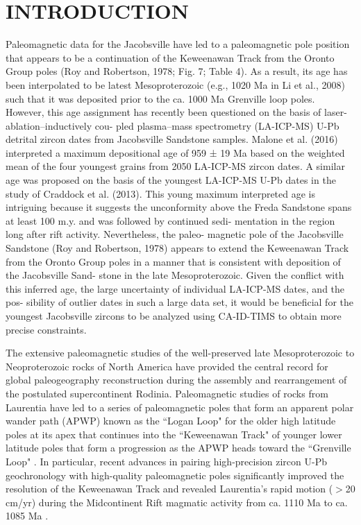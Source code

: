 \documentclass[11pt,letterpaper]{article}
\begin{document}
\section*{INTRODUCTION}

Paleomagnetic data for the Jacobsville have led to a paleomagnetic pole position that appears to be a continuation of the Keweenawan Track from the Oronto Group poles (Roy and Robertson, 1978; Fig. 7; Table 4). As a result, its age has been interpolated to be latest Mesoproterozoic (e.g., 1020 Ma in Li et al., 2008) such that it was deposited prior to the ca. 1000 Ma Grenville loop poles. However, this age assignment has recently been questioned on the basis of laser-ablation–inductively cou- pled plasma–mass spectrometry (LA-ICP-MS) U-Pb detrital zircon dates from Jacobsville Sandstone samples. Malone et al. (2016) interpreted a maximum depositional age of 959 ± 19 Ma based on the weighted mean of the four youngest grains from 2050 LA-ICP-MS zircon dates. A similar age was proposed on the basis of the youngest LA-ICP-MS U-Pb dates in the study of Craddock et al. (2013). This young maximum interpreted age is intriguing because it suggests the unconformity above the Freda Sandstone spans at least 100 m.y. and was followed by continued sedi- mentation in the region long after rift activity. Nevertheless, the paleo- magnetic pole of the Jacobsville Sandstone (Roy and Robertson, 1978) appears to extend the Keweenawan Track from the Oronto Group poles in a manner that is consistent with deposition of the Jacobsville Sand- stone in the late Mesoproterozoic. Given the conflict with this inferred age, the large uncertainty of individual LA-ICP-MS dates, and the pos- sibility of outlier dates in such a large data set, it would be beneficial for the youngest Jacobsville zircons to be analyzed using CA-ID-TIMS to obtain more precise constraints.


The extensive paleomagnetic studies of the well-preserved late Mesoproterozoic to Neoproterozoic rocks of North America have provided the central record for global paleogeography reconstruction during the assembly and rearrangement of the postulated supercontinent Rodinia. Paleomagnetic studies of rocks from Laurentia have led to a series of paleomagnetic poles that form an apparent polar wander path (APWP) known as the ``Logan Loop" for the older high latitude poles at its apex that continues into the ``Keweenawan Track" of younger lower latitude poles that form a progression as the APWP heads toward the ``Grenville Loop" \citep{Swanson-Hysell2019a}. In particular, recent advances in pairing high-precision zircon U-Pb geochronology with high-quality paleomagnetic poles significantly improved the resolution of the Keweenawan Track and revealed Laurentia's rapid motion ($>$20 cm/yr) during the Midcontinent Rift magmatic activity from ca. 1110 Ma to ca. 1085 Ma \citep{Swanson-Hysell2019a}. 
\end{document}
